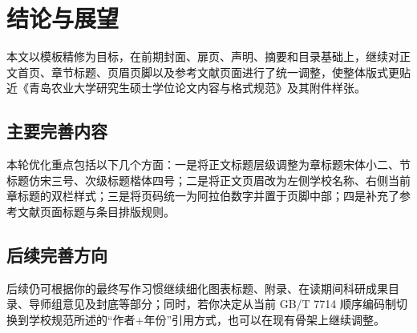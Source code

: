 \chapter{结论与展望}

本文以模板精修为目标，在前期封面、扉页、声明、摘要和目录基础上，继续对正文首页、章节标题、页眉页脚以及参考文献页面进行了统一调整，使整体版式更贴近《青岛农业大学研究生硕士学位论文内容与格式规范》及其附件样张。

\section{主要完善内容}

本轮优化重点包括以下几个方面：一是将正文标题层级调整为章标题宋体小二、节标题仿宋三号、次级标题楷体四号；二是将正文页眉改为左侧学校名称、右侧当前章标题的双栏样式；三是将页码统一为阿拉伯数字并置于页脚中部；四是补充了参考文献页面标题与条目排版规则。

\section{后续完善方向}

后续仍可根据你的最终写作习惯继续细化图表标题、附录、在读期间科研成果目录、导师组意见及封底等部分；同时，若你决定从当前 GB/T 7714 顺序编码制切换到学校规范所述的“作者+年份”引用方式，也可以在现有骨架上继续调整。
